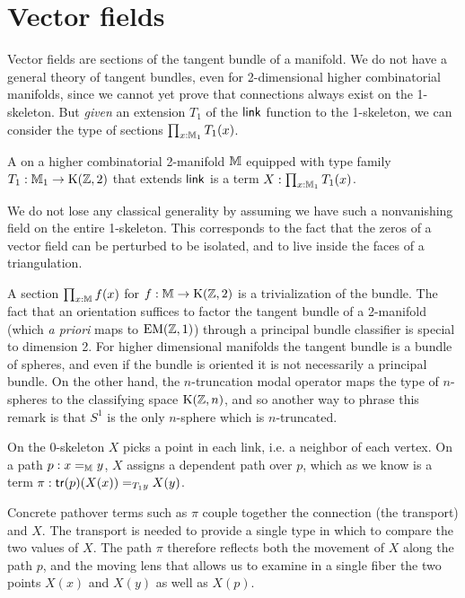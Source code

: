 \section{Vector fields}
Vector fields are sections of the tangent bundle of a manifold. We do not have a general theory of tangent bundles, even for 2-dimensional higher combinatorial manifolds, since we cannot yet prove that connections always exist on the 1-skeleton. But \emph{given} an extension \( T_1 \) of the \( \operatorname{\mathsf{link}} \) function to the 1-skeleton, we can consider the type of sections \( \prod_{x:\mathbb{M}_1}T_1(x) \).

\begin{mydef}
A  on a higher combinatorial 2-manifold \( \mathbb{M} \) equipped with type family \( T_1:\mathbb{M}_1\to\mathrm{K}(\mathbb{Z},2) \) that extends \( \operatorname{\mathsf{link}} \) is a term \( X:\prod_{x:\mathbb{M}_1}T_1(x) \). 
\end{mydef}

\begin{mynote}
We do not lose any classical generality by assuming we have such a nonvanishing field on the entire 1-skeleton. This corresponds to the fact that the zeros of a vector field can be perturbed to be isolated, and to live inside the faces of a triangulation.
\end{mynote}

\begin{mynote}
A section \( \prod_{x:\mathbb{M}}f(x) \) for \( f:\mathbb{M}\to\mathrm{K}(\mathbb{Z},2) \) is a trivialization of the bundle. The fact that an orientation suffices to factor the tangent bundle of a 2-manifold (which \emph{a priori} maps to \( \mathrm{EM}(\mathbb{Z},1) \)) through a principal bundle classifier is special to dimension 2. For higher dimensional manifolds the tangent bundle is a bundle of spheres, and even if the bundle is oriented it is not necessarily a principal bundle. On the other hand, the \( n \)-truncation modal operator maps the type of \( n \)-spheres to the classifying space \( \mathrm{K}(\mathbb{Z},n) \), and so another way to phrase this remark is that \( S^1 \) is the only \( n \)-sphere which is \( n \)-truncated.
\end{mynote}

On the 0-skeleton \( X \) picks a point in each link, i.e. a neighbor of each vertex. On a path \( p:x=_{\mathbb{M}} y \), \( X \) assigns a dependent path over \( p \), which as we know is a term \( \pi:\mathsf{tr}(p)(X(x))=_{T_1 y} X(y) \).

\begin{mynote}Concrete pathover terms such as \( \pi \) couple together the connection (the transport) and \( X \). The transport is needed to provide a single type in which to compare the two values of \( X \). The path \( \pi \) therefore reflects both the movement of \( X \) along the path \( p \), and the moving lens that allows us to examine in a single fiber the two points \( X(x) \) and \( X(y) \) as well as \( X(p) \).\end{mynote}

